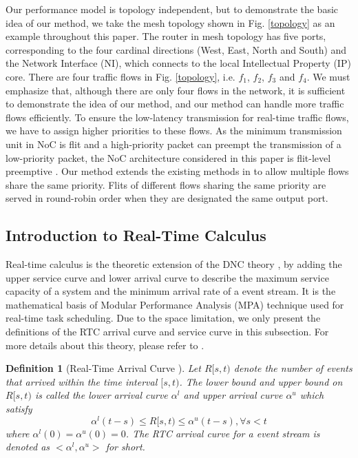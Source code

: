 \documentclass[10pt,journal]{IEEEtran}
\newtheorem{definition}{Definition}
\begin{document}
Our performance model is topology independent, but to demonstrate the basic idea of our method, we take the mesh topology shown in Fig. \ref{topology} as an example throughout this paper. The router in mesh topology has five ports, corresponding to the four cardinal directions (West, East, North and South) and the Network Interface (NI), which connects to the local Intellectual Property (IP) core. There are four traffic flows in Fig. \ref{topology}, i.e. $f_1$, $f_2$, $f_3$ and $f_4$. We must emphasize that, although there are only four flows in the network, it is sufficient to demonstrate the idea of our method, and our method can handle more traffic flows efficiently. To ensure the low-latency transmission for real-time traffic flows, we have to assign higher priorities to these flows. As the minimum transmission unit in NoC is flit and a high-priority packet can preempt the transmission of a low-priority packet, the NoC architecture considered in this paper is flit-level preemptive \cite{Lee:2003:RWC:846077.846083}. Our method extends the existing methods in \cite{73}\cite{Qian489900} to allow multiple flows share the same priority. Flits of different flows sharing the same priority are served in round-robin order when they are designated the same output port.

\subsection{Introduction to Real-Time Calculus}\label{intrortc}
Real-time calculus \cite{1253607} is the theoretic extension of the DNC theory \cite{Boudec2001Network}, by adding the upper service curve and lower arrival curve to describe the maximum service capacity of a system and the minimum arrival rate of a event stream. It is the mathematical basis of Modular Performance Analysis (MPA) \cite{Wandeler2006System} technique used for real-time task scheduling. Due to the space limitation, we only present the definitions of the RTC arrival curve and service curve in this subsection. For more details about this theory, please refer to \cite{1253607}.
\begin{definition}[Real-Time Arrival Curve \cite{1253607}]
Let $R[s,t)$ denote the number of events that arrived within the time interval $[s,t)$. The lower bound and upper bound on $R[s,t)$ is called the lower arrival curve $\alpha^l$ and upper arrival curve $\alpha^u$ which satisfy
$$\alpha^l(t-s)\leq R[s,t)\leq \alpha^u(t-s),\forall s<t$$
where $\alpha^l(0)=\alpha^u(0)=0$. The RTC arrival curve for a event stream is denoted as $<\alpha^l,\alpha^u>$ for short.
\end{definition}
\end{document}

